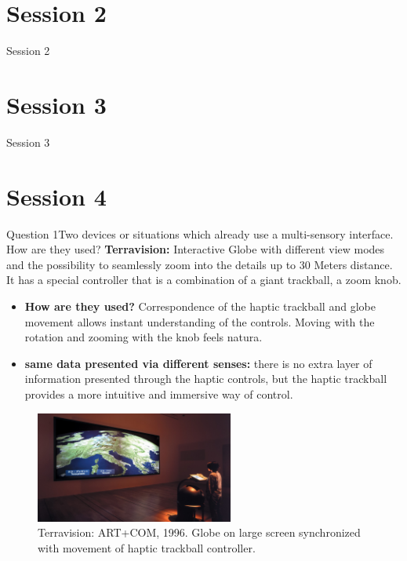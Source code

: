 \documentclass[t,aspectratio=169,divpsnames]{beamer}
\begin{document}
\section{Session 2}
\begin{frame}{Session 2}
    
\end{frame}
\section{Session 3}
\begin{frame}{Session 3}
    
\end{frame}
\section{Session 4}

\begin{frame}{Question 1}{Two devices or situations which already use a multi-sensory interface. How are they used? }
\scriptsize
\textbf{Terravision:} Interactive Globe with different view modes and the possibility to seamlessly zoom into the details up to 30 Meters distance. It has a special controller that is a combination of a giant trackball, a zoom knob.
    \begin{itemize}\scriptsize
    \item \textbf{How are they used?} Correspondence of the haptic trackball and globe movement allows instant understanding of the controls. Moving with the rotation and zooming with the knob feels natura.
    \item \textbf{same data presented via different senses:} there is no extra layer of information presented through the haptic controls, but the haptic trackball provides a more intuitive and immersive way of control.  
\end{itemize}

\begin{figure}
    \vspace{-0.1cm}
	\includegraphics[width=6.5cm]{images/1996_Terravision_02-1360x765.jpg}
  \vspace{-0.3cm}

	\caption{\scriptsize Terravision: ART+COM, 1996. Globe on large screen synchronized with movement of haptic trackball controller.}
\end{figure}
\end{frame}
\end{document}
